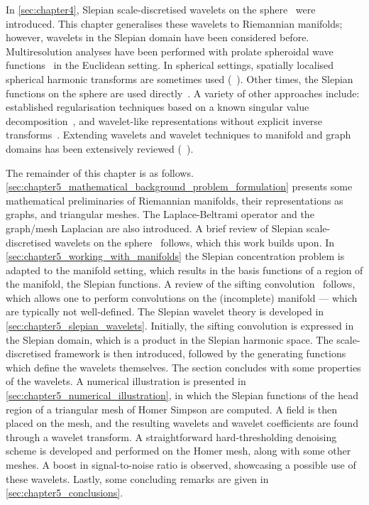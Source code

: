 In \cref{sec:chapter4}, Slepian scale-discretised wavelets on the sphere~\cite{Roddy2021a} were introduced.
This chapter generalises these wavelets to Riemannian manifolds; however, wavelets in the Slepian domain have been considered before.
Multiresolution analyses have been performed with prolate spheroidal wave functions~\cite{Walter2004} in the Euclidean setting.
In spherical settings, spatially localised spherical harmonic transforms are sometimes used (\eg{}~\cite{Simons1997,Wieczorek2005,Khalid2013,Khalid2013a}).
Other times, the Slepian functions on the sphere are used directly~\cite{Simons2009}.
A variety of other approaches include: established regularisation techniques based on a known singular value decomposition~\cite{Michel2017}, and wavelet-like representations without explicit inverse transforms~\cite{Simons2011}.
Extending wavelets and wavelet techniques to manifold and graph domains has been extensively reviewed (\eg{}~\cite{Dahmen1999,Coifman2006a}).

The remainder of this chapter is as follows.
\cref{sec:chapter5_mathematical_background_problem_formulation} presents some mathematical preliminaries of Riemannian manifolds, their representations as graphs, and triangular meshes.
The Laplace-Beltrami operator and the graph/mesh Laplacian are also introduced.
A brief review of Slepian scale-discretised wavelets on the sphere~\cite{Roddy2021a} follows, which this work builds upon.
In \cref{sec:chapter5_working_with_manifolds} the Slepian concentration problem is adapted to the manifold setting, which results in the basis functions of a region of the manifold, \ie{} the Slepian functions.
A review of the sifting convolution~\cite{Roddy2021} follows, which allows one to perform convolutions on the (incomplete) manifold --- which are typically not well-defined.
The Slepian wavelet theory is developed in \cref{sec:chapter5_slepian_wavelets}.
Initially, the sifting convolution is expressed in the Slepian domain, which is a product in the Slepian harmonic space.
The scale-discretised framework is then introduced, followed by the generating functions which define the wavelets themselves.
The section concludes with some properties of the wavelets.
A numerical illustration is presented in \cref{sec:chapter5_numerical_illustration}, in which the Slepian functions of the head region of a triangular mesh of Homer Simpson are computed.
A field is then placed on the mesh, and the resulting wavelets and wavelet coefficients are found through a wavelet transform.
A straightforward hard-thresholding denoising scheme is developed and performed on the Homer mesh, along with some other meshes.
A boost in signal-to-noise ratio is observed, showcasing a possible use of these wavelets.
Lastly, some concluding remarks are given in \cref{sec:chapter5_conclusions}.

